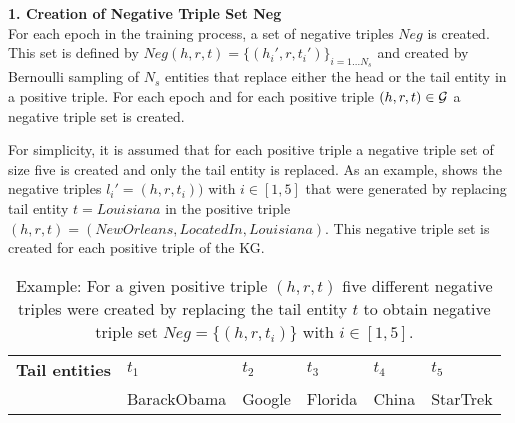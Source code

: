 \textbf{1. Creation of Negative Triple Set Neg}\\
For each epoch in the training process, a set of negative triples $Neg$ is created.
This set is defined by $Neg(h,r,t)=\{(h_i',r,t_i')\}_{i=1\dots N_s}$ and created by Bernoulli sampling of $N_s$ entities that replace either the head or the tail entity in a positive triple.
For each epoch and for each positive triple $(h,r,t) \in \mathcal{G}$ a negative triple set is created.

For simplicity, it is assumed that for each positive triple a negative triple set of size five is created and only the tail entity is replaced.
As an example,  shows the negative triples $l_i' = (h, r, t_i))$ with $i \in [1,5]$ that were generated by replacing tail entity $t = Louisiana$ in the positive triple $(h, r, t) = (NewOrleans, LocatedIn, Louisiana)$. 
This negative triple set is created for each positive triple of the KG.
\begin{table}[H]
    \centering
    \begin{tabular}{llllll}
        \toprule
        
        \textbf{Tail entities}
        & \textbf{$t_1$} & \textbf{$t_2$} & \textbf{$t_3$} & \textbf{$t_4$} & \textbf{$t_5$} \\
        
        & BarackObama 
        & Google  
        & Florida 
        & China 
        & StarTrek\\

        \bottomrule
    \end{tabular}
    \caption{Example: For a given positive triple $(h,r,t)$ five different negative triples were created by replacing the tail entity $t$ to obtain negative triple set $Neg = \{(h,r,t_i)\}$ with $i \in [1,5]$.}
\label{tab:neg_example}
\end{table}